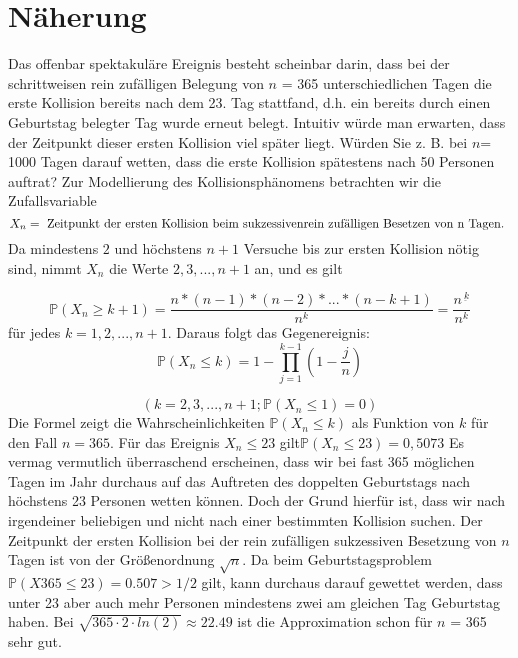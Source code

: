\documentclass[11pt]{article}
\begin{document}
    \section{Näherung}

    Das offenbar spektakuläre Ereignis besteht scheinbar darin, dass bei der schrittweisen rein zufälligen Belegung
    von \(n\) = 365 unterschiedlichen Tagen die erste Kollision bereits nach dem 23. Tag stattfand, d.h. ein bereits
    durch einen Geburtstag belegter Tag wurde erneut belegt. Intuitiv würde man erwarten, dass der Zeitpunkt dieser
    ersten Kollision viel später liegt. Würden Sie z. B. bei \(n\)= 1000 Tagen darauf wetten, dass die erste Kollision
    spätestens nach 50 Personen auftrat?
    \newline
    Zur Modellierung des Kollisionsphänomens betrachten wir die Zufallsvariable
    \newline
    \[{ X_{n} = \text{ Zeitpunkt der ersten Kollision beim sukzessiven \newline rein zufälligen Besetzen von n Tagen. } }\]
    \newline
    Da mindestens \(2\) und höchstens \(n + 1\) Versuche bis zur ersten Kollision nötig sind, nimmt \(X_n\) die Werte \(2,3, . . ., n + 1\) an, und es gilt


    \[\mathbb{P}(X_{n} \geq k+1) = \frac {n*(n-1)*(n-2)* ... * (n-k + 1)}{n^k} = \frac{n^{\underline{\ k}}}{n^k}\]
    \newline\newline
    für jedes \(k = 1,2,...,n+1\).
    \newline
    Daraus folgt das Gegenereignis:
    \newline\newline
    \[\mathbb{P}(X_{n} \leq k) = 1-\prod \limits_{j=1}^{k-1}(1- \frac{j}{n})\]

    \[(k=2,3,...,n+1; \mathbb{P}(X_n\leq1) = 0)\]
    \newline
    Die Formel zeigt die Wahrscheinlichkeiten \(\mathbb{P}(X_{n} \leq k)\) als Funktion von \(k\) für den Fall \(n = 365\).
    Für das Ereignis \({X_{n} \leq 23}\) gilt\( \mathbb{P}(X_{n} \leq 23) = 0,5073 \)
    \newline
    \newline
    Es vermag vermutlich überraschend erscheinen, dass wir bei fast 365 möglichen Tagen im Jahr durchaus auf das
    Auftreten des doppelten Geburtstags nach höchstens 23 Personen wetten können. Doch der Grund hierfür ist, dass wir
    nach irgendeiner beliebigen und nicht nach einer bestimmten Kollision suchen.
    Der Zeitpunkt der ersten Kollision bei der rein zufälligen sukzessiven Besetzung von \(n\) Tagen ist von
    der Größenordnung \(\sqrt{n}\).
    \newline
    \newline
    Da beim Geburtstagsproblem  \(\mathbb{P} (X365 \leq 23) = 0.507 > 1/2\) gilt, kann durchaus darauf gewettet werden,
    dass unter 23 aber auch mehr Personen mindestens zwei am gleichen Tag Geburtstag haben. Bei
    \(\sqrt{365 \cdot 2 \cdot ln(2)} \approx 22.49\)
    ist die Approximation schon für \(n\) = 365 sehr gut.
\end{document}
